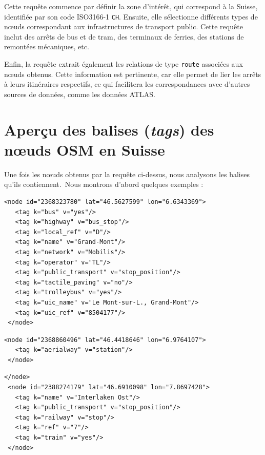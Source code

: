 Cette requête commence par définir la zone d’intérêt, qui correspond à la Suisse, identifiée par son code ISO3166-1 \texttt{CH}. Ensuite, elle sélectionne différents types de nœuds correspondant aux infrastructures de transport public. Cette requête inclut des arrêts de bus et de tram, des terminaux de ferries, des stations de remontées mécaniques, etc.


Enfin, la requête extrait également les relations de type \texttt{route} associées aux nœuds obtenus. Cette information est pertinente, car elle permet de lier les arrêts à leurs itinéraires respectifs, ce qui facilitera les correspondances avec d’autres sources de données, comme les données ATLAS.

\section{Aperçu des balises (\textit{tags}) des nœuds OSM en Suisse}
Une fois les nœuds obtenus par la requête ci-dessus, nous analysons les balises qu'ils contiennent.\
Nous montrons d’abord quelques exemples :
\begin{tcolorbox}[colback=gray!10, colframe=brown, title=OSM N\oe ud : Grand-Mont]
\begin{verbatim}
<node id="2368323780" lat="46.5627599" lon="6.6343369">
   <tag k="bus" v="yes"/>
   <tag k="highway" v="bus_stop"/>
   <tag k="local_ref" v="D"/>
   <tag k="name" v="Grand-Mont"/>
   <tag k="network" v="Mobilis"/>
   <tag k="operator" v="TL"/>
   <tag k="public_transport" v="stop_position"/>
   <tag k="tactile_paving" v="no"/>
   <tag k="trolleybus" v="yes"/>
   <tag k="uic_name" v="Le Mont-sur-L., Grand-Mont"/>
   <tag k="uic_ref" v="8504177"/>
 </node>
\end{verbatim}
\end{tcolorbox}
\begin{tcolorbox}[colback=gray!10, colframe=brown, title=OSM N\oe ud sans nom]
\begin{verbatim}
<node id="2368860496" lat="46.4418646" lon="6.9764107">
   <tag k="aerialway" v="station"/>
 </node>
\end{verbatim}
\end{tcolorbox}
\begin{tcolorbox}[colback=gray!10, colframe=brown, title=OSM N\oe ud : Interlaken Ost]
\begin{verbatim}
</node>
 <node id="2388274179" lat="46.6910098" lon="7.8697428">
   <tag k="name" v="Interlaken Ost"/>
   <tag k="public_transport" v="stop_position"/>
   <tag k="railway" v="stop"/>
   <tag k="ref" v="7"/>
   <tag k="train" v="yes"/>
 </node>
\end{verbatim}
\end{tcolorbox}

